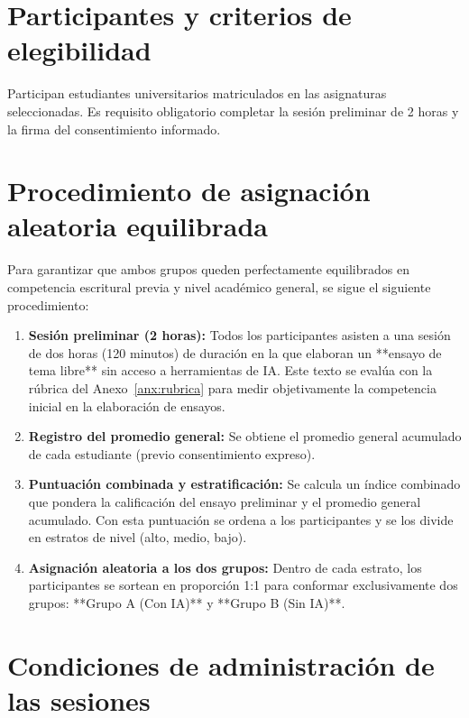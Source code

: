 \documentclass[12pt,a4paper,openany]{report}
\begin{document}
    \section{Participantes y criterios de elegibilidad}
    
    Participan estudiantes universitarios matriculados en las asignaturas seleccionadas. Es requisito obligatorio completar la sesi\'on preliminar de 2 horas y la firma del consentimiento informado.
    
    \section{Procedimiento de asignaci\'on aleatoria equilibrada}
    \label{sec:asignacion}
    
    Para garantizar que ambos grupos queden perfectamente equilibrados en competencia escritural previa y nivel acad\'emico general, se sigue el siguiente procedimiento:
    
    \begin{enumerate}[label=\textbf{Paso \arabic*.},leftmargin=1.9cm]
        \item \textbf{Sesi\'on preliminar (2 horas):} Todos los participantes asisten a una sesi\'on de dos horas (120 minutos) de duraci\'on en la que elaboran un **ensayo de tema libre** sin acceso a herramientas de IA. Este texto se eval\'ua con la r\'ubrica del Anexo~\ref{anx:rubrica} para medir objetivamente la competencia inicial en la elaboraci\'on de ensayos.
        \item \textbf{Registro del promedio general:} Se obtiene el promedio general acumulado de cada estudiante (previo consentimiento expreso).
        \item \textbf{Puntuaci\'on combinada y estratificaci\'on:} Se calcula un \'indice combinado que pondera la calificaci\'on del ensayo preliminar y el promedio general acumulado. Con esta puntuaci\'on se ordena a los participantes y se los divide en estratos de nivel (alto, medio, bajo).
        \item \textbf{Asignaci\'on aleatoria a los dos grupos:} Dentro de cada estrato, los participantes se sortean en proporci\'on 1:1 para conformar exclusivamente dos grupos: **Grupo A (Con IA)** y **Grupo B (Sin IA)**.
    \end{enumerate}
    
    \section{Condiciones de administraci\'on de las sesiones}
    
\end{document}
